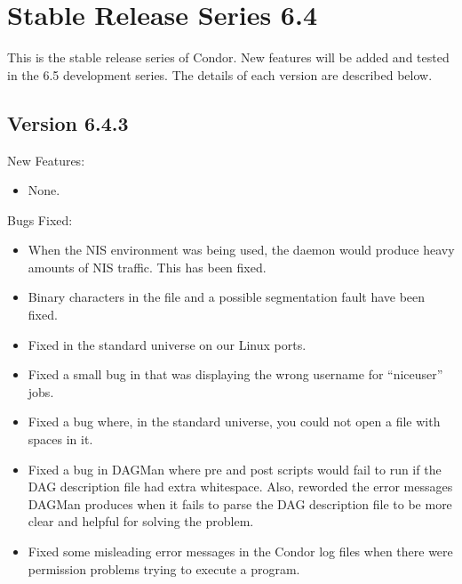 \section{\label{sec:History-6-4}Stable Release Series 6.4}

This is the stable release series of Condor.
New features will be added and tested in the 6.5 development series. 
The details of each version are described below.
\subsection{\label{sec:New-6-4-3}Version 6.4.3}

\noindent New Features:
\begin{itemize}

\item None.

\end{itemize}

\noindent Bugs Fixed:
\begin{itemize}

\item When the NIS environment was being used, the  daemon
would produce heavy amounts of NIS traffic. This has been fixed.

\item Binary characters in the  file and a possible
segmentation fault have been fixed.

\item Fixed  in the standard universe on our Linux ports.

\item Fixed a small bug in  that was displaying the wrong
username for ``niceuser'' jobs.

\item Fixed a bug where, in the standard universe, you could not open a file
with spaces in it.

\item Fixed a bug in DAGMan where pre and post scripts would fail to
run if the DAG description file had extra whitespace.
Also, reworded the error messages DAGMan produces when it fails to
parse the DAG description file to be more clear and helpful for
solving the problem.

\item Fixed some misleading error messages in the Condor log files
when there were permission problems trying to execute a program. 

\end{itemize}

